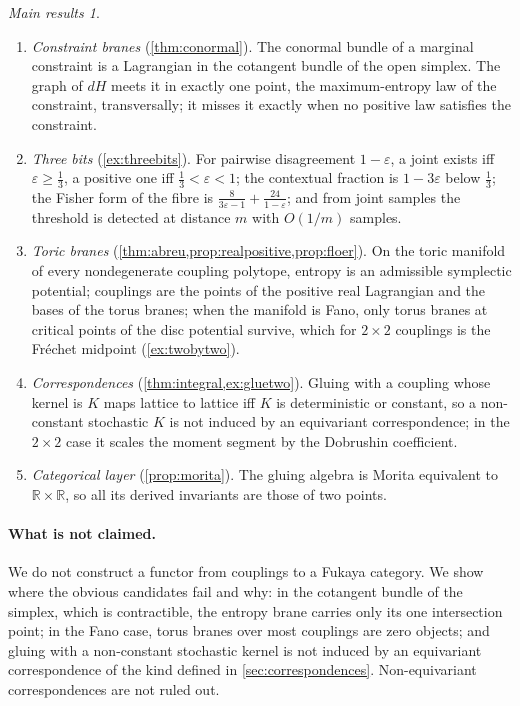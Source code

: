 \documentclass[11pt]{article}
\theoremstyle{definition}
\theoremstyle{remark}
\newtheorem*{mainthm}{Main results}
\newcommand{\R}{\mathbb{R}}
\begin{document}
\begin{mainthm}
\leavevmode
\begin{enumerate}[label=(\Alph*),leftmargin=*]
\item \emph{Constraint branes} (\cref{thm:conormal}). The conormal bundle of a marginal constraint is a Lagrangian in the
  cotangent bundle of the open simplex. The graph of $dH$ meets it in exactly one point, the maximum-entropy law of the
  constraint, transversally; it misses it exactly when no positive law satisfies the constraint.
\item \emph{Three bits} (\cref{ex:threebits}). For pairwise disagreement $1-\varepsilon$, a joint exists iff $\varepsilon\ge\frac13$, a
  positive one iff $\frac13<\varepsilon<1$; the contextual fraction is $1-3\varepsilon$ below $\frac13$; the Fisher form of the fibre is
  $\frac8{3\varepsilon-1}+\frac{24}{1-\varepsilon}$; and from joint samples the threshold is detected at distance $m$ with $O(1/m)$ samples.
\item \emph{Toric branes} (\cref{thm:abreu,prop:realpositive,prop:floer}). On the toric manifold of every nondegenerate
  coupling polytope, entropy is an admissible symplectic potential; couplings are the points of the positive real Lagrangian
  and the bases of the torus branes; when the manifold is Fano, only torus branes at critical points of the disc potential
  survive, which for $2\times2$ couplings is the Fréchet midpoint (\cref{ex:twobytwo}).
\item \emph{Correspondences} (\cref{thm:integral,ex:gluetwo}). Gluing with a coupling whose kernel is $K$ maps lattice to
  lattice iff $K$ is deterministic or constant, so a non-constant stochastic $K$ is not induced by an equivariant correspondence; in the $2\times2$ case it scales the moment segment by the Dobrushin coefficient.
\item \emph{Categorical layer} (\cref{prop:morita}). The gluing algebra is Morita equivalent to $\R\times\R$, so all its derived
  invariants are those of two points.
\end{enumerate}
\end{mainthm}

\paragraph{What is not claimed.} We do not construct a functor from couplings to a Fukaya category. We show where the obvious
candidates fail and why: in the cotangent bundle of the simplex, which is contractible, the entropy brane carries only its one
intersection point; in the Fano case, torus branes over most couplings are zero objects; and gluing with a non-constant
stochastic kernel is not induced by an equivariant correspondence of the kind defined in \cref{sec:correspondences}.
Non-equivariant correspondences are not ruled out.
\end{document}
